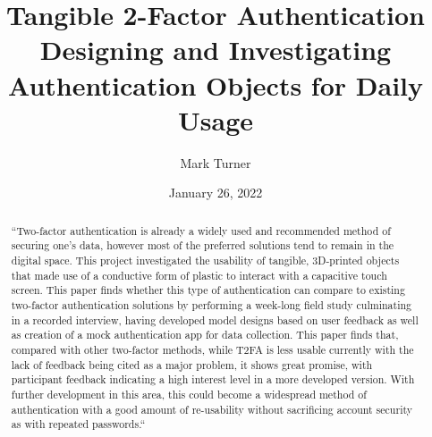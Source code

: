 \documentclass{l4proj}
\begin{document}
\title{Tangible 2-Factor Authentication\\ \Large{Designing and Investigating Authentication Objects for Daily Usage}}
\author{Mark Turner}
\date{January 26, 2022}
\maketitle

\begin{abstract}
   ``Two-factor authentication is already a widely used and recommended method of securing one's data, however most of the preferred solutions tend to remain in the digital space.  This project investigated the usability of tangible, 3D-printed objects that made use of a conductive form of plastic to interact with a capacitive touch screen. This paper finds whether this type of authentication can compare to existing two-factor authentication solutions by performing a week-long field study culminating in a recorded interview, having developed model designs based on user feedback as well as creation of a mock authentication app for data collection. This paper finds that, compared with other two-factor methods, while T2FA is less usable currently with the lack of feedback being cited as a major problem, it shows great promise, with participant feedback indicating a high interest level in a more developed version. With further development in this area, this could become a widespread method of authentication with a good amount of re-usability without sacrificing account security as with repeated passwords.``

\end{abstract}


%
%
\def\consentname {Mark Turner} %
\def\consentdate {26 January 2022} %
%
\educationalconsent
\end{document}
